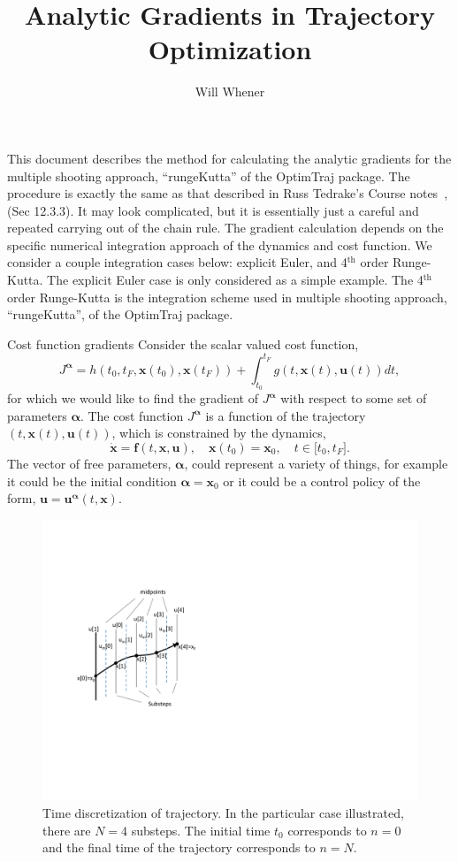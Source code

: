 \documentclass[onecolumn,11pt]{article}
\title{Analytic Gradients in Trajectory Optimization}
\author{Will Whener}
\makeatletter
\newcommand{\bs}{\boldsymbol}
\def\section{\@startsection {section}{1}{\z@}{24pt plus 2pt minus 2pt}
{12pt plus 2pt minus 2pt}{\large\bf\color{RoyalBlue}}}
\makeatother
\begin{document}
\maketitle

This document describes the method for calculating the analytic gradients for the multiple shooting approach, ``rungeKutta'' of the OptimTraj package. The procedure is exactly the same as that described in Russ Tedrake's Course notes~\cite{tedrakeNotes},(Sec 12.3.3). It may look complicated, but it is essentially just a careful and repeated carrying out of the chain rule. The gradient calculation depends on the specific numerical integration approach of the dynamics and cost function. We consider a couple integration cases below: explicit Euler, and 4$^{\text{th}}$ order Runge-Kutta. The explicit Euler case is only considered as a simple example. The 4$^{\text{th}}$ order Runge-Kutta is the integration scheme used in multiple shooting approach, ``rungeKutta'', of the OptimTraj package.

\section{Cost function gradients}
Consider the scalar valued cost function,
\begin{equation}
J^{\bs \alpha} = h(t_0,t_F,\bs x(t_0),\bs x(t_F)) + \int_{t_0}^{t_F}  g(t, \bs x(t), \bs u(t)) dt,
\label{eq:Cost}
\end{equation}
for which we would like to find the gradient of $J^{\bs \alpha}$ with respect to some set of parameters $\bs \alpha$. The cost function $J^{\bs \alpha}$ is a function of the trajectory $(t,\bs x(t),\bs u(t))$, which is constrained by the dynamics,
\begin{equation}
\dot{\bs x} =\bs f(t,\bs x,\bs u), \quad \bs x(t_0) = \bs x_0, \quad t \in \lbrack t_0, t_F\rbrack.
\label{eq:dynamics}
\end{equation}
The vector of free parameters, $\bs \alpha$, could represent a variety of things, for example it could be the initial condition $\bs \alpha = \bs x_0$ or it could be a control policy of the form, $\bs u = \bs u^{\bs \alpha}(t,\bs x)$.

\begin{figure}[h]
\centering
\hspace{0mm}
\includegraphics[width=.38\textwidth]{Figures/singleShooting.pdf}
\vspace{-2mm} 
\caption{Time discretization of trajectory. In the particular case illustrated, there are $N=4$ substeps. The initial time $t_0$ corresponds to $n=0$ and the final time of the trajectory corresponds to $n=N$.}
\label{fig:singleShoot}
\end{figure}
\end{document}
